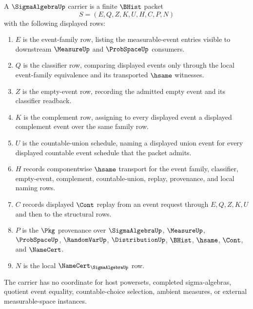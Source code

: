 \begin{definition}
\label{def:sigma-algebra-carrier}
A $\SigmaAlgebraUp$ carrier is a finite $\BHist$ packet
$$
S=(E,Q,Z,K,U,H,C,P,N)
$$
with the following displayed rows:
\begin{enumerate}
\item $E$ is the event-family row, listing the measurable-event entries visible to downstream $\MeasureUp$ and $\ProbSpaceUp$ consumers.
\item $Q$ is the classifier row, comparing displayed events only through the local event-family equivalence and its transported $\hsame$ witnesses.
\item $Z$ is the empty-event row, recording the admitted empty event and its classifier readback.
\item $K$ is the complement row, assigning to every displayed event a displayed complement event over the same family row.
\item $U$ is the countable-union schedule, naming a displayed union event for every displayed countable event schedule that the packet admits.
\item $H$ records componentwise $\hsame$ transport for the event family, classifier, empty-event, complement, countable-union, replay, provenance, and local naming rows.
\item $C$ records displayed $\Cont$ replay from an event request through $E,Q,Z,K,U$ and then to the structural rows.
\item $P$ is the $\Pkg$ provenance over $\SigmaAlgebraUp$, $\MeasureUp$, $\ProbSpaceUp$, $\RandomVarUp$, $\DistributionUp$, $\BHist$, $\hsame$, $\Cont$, and $\NameCert$.
\item $N$ is the local $\NameCert_{\SigmaAlgebraUp}$ row.
\end{enumerate}
The carrier has no coordinate for host powersets, completed sigma-algebras, quotient event equality, countable-choice selection, ambient measures, or external measurable-space instances.
\end{definition}

